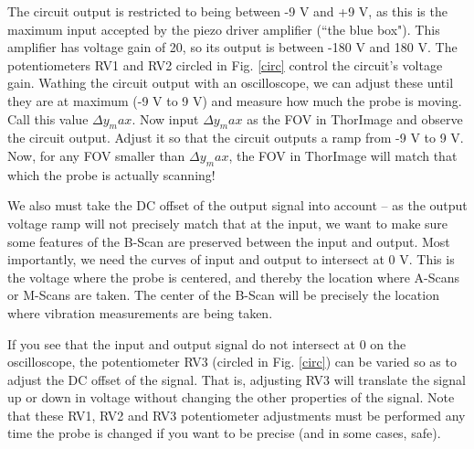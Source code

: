 \documentclass{article}
\begin{document}
\par{The circuit output is restricted to being between -9 V and +9 V, as this is the maximum input accepted by the piezo driver amplifier (``the blue box"). This amplifier has voltage gain of 20, so its output is between -180 V and 180 V. The potentiometers RV1 and RV2 circled in Fig. \ref{circ} control the circuit's voltage gain. Wathing the circuit output with an oscilloscope, we can adjust these until they are at maximum (-9 V to 9 V) and measure how much the probe is moving. Call this value $\Delta y_max$. Now input $\Delta y_max$ as the FOV in ThorImage and observe the circuit output.  Adjust it so that the circuit outputs a ramp from -9 V to 9 V. Now, for any FOV smaller than $\Delta y_max$, the FOV in ThorImage will match that which the probe is actually scanning!}

\par{We also must take the DC offset of the output signal into account -- as the output voltage ramp will not precisely match that at the input, we want to make sure some features of the B-Scan are preserved between the input and output. Most importantly, we need the curves of input and output to intersect at 0 V. This is the voltage where the probe is centered, and thereby the location where A-Scans or M-Scans are taken. The center of the B-Scan will be precisely the location where vibration measurements are being taken.}

\par{If you see that the input and output signal do not intersect at 0 on the oscilloscope, the potentiometer RV3 (circled in Fig. \ref{circ}) can be varied so as to adjust the DC offset of the signal. That is, adjusting RV3 will translate the signal up or down in voltage without changing the other properties of the signal. Note that these RV1, RV2 and RV3 potentiometer adjustments must be performed any time the probe is changed if you want to be precise (and in some cases, safe). }
\end{document}
